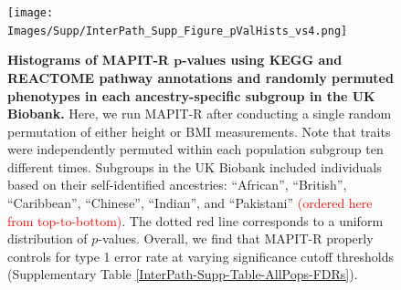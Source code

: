 \documentclass[10pt]{article}
\begin{document}

\begin{figure}[htbp]
\centering
\vspace*{-2cm}
\texttt{[image: Images/Supp/InterPath\_Supp\_Figure\_pValHists\_vs4.png]}
\caption{\textbf{Histograms of MAPIT-R $\bm{p}$-values using KEGG and REACTOME pathway annotations and randomly permuted phenotypes in each ancestry-specific subgroup in the UK Biobank.} Here, we run MAPIT-R after conducting a single random permutation of either height or BMI measurements. Note that traits were independently permuted within each population subgroup ten different times. Subgroups in the UK Biobank included individuals based on their self-identified ancestries: ``African'', ``British'', ``Caribbean'', ``Chinese'', ``Indian'', and ``Pakistani'' \textcolor{red}{(ordered here from top-to-bottom)}. The dotted red line corresponds to a uniform distribution of $p$-values. Overall, we find that MAPIT-R properly controls for type 1 error rate at varying significance cutoff thresholds (Supplementary Table \ref{InterPath-Supp-Table-AllPops-FDRs}).}
\label{InterPath-Supp-Figure-10perms-pValHists}
\end{figure}
\clearpage
\setlength{\footskip}{1cm}

\end{document}
